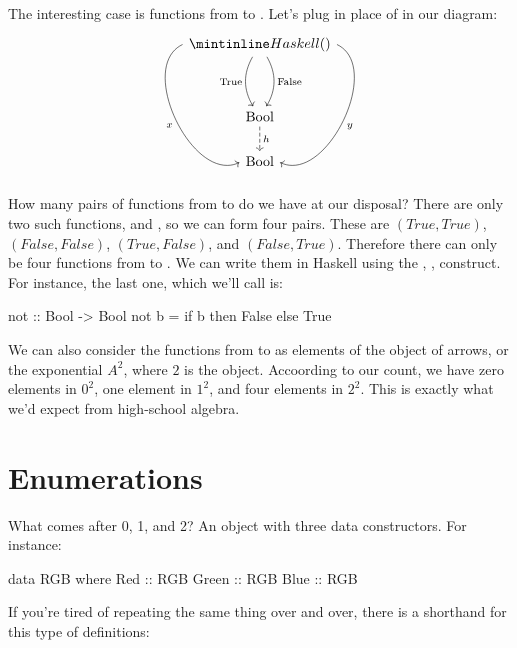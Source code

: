 \documentclass[DaoFP]{subfiles}
\begin{document}
The interesting case is functions from  to . Let's plug  in place of  in our diagram:
\[
 \begin{tikzcd}
 \hask{()}
 \arrow[dd, bend right, "\text{True}"']
 \arrow[dd, bend left, "\text{False}"]
  \arrow[ddd, bend right =90, "x"']
 \arrow[ddd, bend left=90, "y"]
\\
 \\
\text{Bool}
\arrow[d, dashed, "h"]
\\
\text{Bool}
 \end{tikzcd}
\]
How many pairs of functions from \hask{()} to  do we have at our disposal? There are only two such functions,  and , so we can form four pairs. These are $(True, True)$, $(False, False)$, $(True, False)$, and $(False, True)$. Therefore there can only be four functions from  to . We can write them in Haskell using the  , ,  construct. For instance, the last one, which we'll call  is:
\begin{haskell}
not :: Bool -> Bool
not b = if b then False else True
\end{haskell}

We can also consider the functions from  to  as elements of the object of arrows, or the exponential $A^2$, where $2$ is the  object. Accoording to our count, we have zero elements in $0^2$, one element in $1^2$, and four elements in $2^2$. This is exactly what we'd expect from high-school algebra.

\section{Enumerations}

What comes after 0, 1, and 2? An object with three data constructors. For instance:
\begin{haskell}
data RGB where
  Red   :: RGB
  Green :: RGB
  Blue  :: RGB
\end{haskell}
If you're tired of repeating the same thing over and over, there is a shorthand for this type of definitions:
\end{document}

